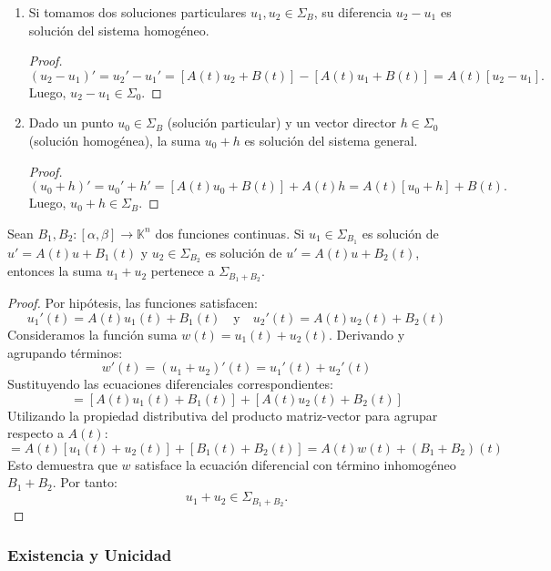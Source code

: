 \begin{enumerate}
    \item Si tomamos dos soluciones particulares $u_1, u_2 \in \Sigma_B$, su diferencia $u_2 - u_1$ es solución del sistema homogéneo.
    \begin{proof}
        \[
            (u_2 - u_1)' = u_2' - u_1' = [A(t) u_2 + B(t)] - [A(t) u_1 + B(t)] = A(t) [u_2 - u_1].
        \]
        Luego, $u_2 - u_1 \in \Sigma_0$.
    \end{proof}
    
    \item Dado un punto $u_0 \in \Sigma_B$ (solución particular) y un vector director $h \in \Sigma_0$ (solución homogénea), la suma $u_0 + h$ es solución del sistema general.
    \begin{proof}
        \[
            (u_0 + h)' = u_0' + h' = [A(t) u_0 + B(t)] + A(t) h = A(t) [u_0 + h] + B(t).
        \]
        Luego, $u_0 + h \in \Sigma_B$.
    \end{proof}
\end{enumerate}

\begin{proposición}
    Sean $B_1, B_2: [\alpha, \beta] \to \mathbb{K}^n$ dos funciones continuas. Si $u_1 \in \Sigma_{B_1}$ es solución de $u' = A(t)u + B_1(t)$ y $u_2 \in \Sigma_{B_2}$ es solución de $u' = A(t)u + B_2(t)$, entonces la suma $u_1 + u_2$ pertenece a $\Sigma_{B_1 + B_2}$.
\end{proposición}

\begin{proof}
    Por hipótesis, las funciones satisfacen:
    \[
        u_1'(t) = A(t) u_1(t) + B_1(t) \quad \text{y} \quad u_2'(t) = A(t) u_2(t) + B_2(t)
    \]
    Consideramos la función suma $w(t) = u_1(t) + u_2(t)$. Derivando y agrupando términos:
    \[
        w'(t) = (u_1 + u_2)'(t) = u_1'(t) + u_2'(t)
    \]
    Sustituyendo las ecuaciones diferenciales correspondientes:
    \[
        = [A(t) u_1(t) + B_1(t)] + [A(t) u_2(t) + B_2(t)]
    \]
    Utilizando la propiedad distributiva del producto matriz-vector para agrupar respecto a $A(t)$:
    \[
        = A(t) [u_1(t) + u_2(t)] + [B_1(t) + B_2(t)] = A(t) w(t) + (B_1 + B_2)(t)
    \]
    Esto demuestra que $w$ satisface la ecuación diferencial con término inhomogéneo $B_1 + B_2$. Por tanto:
    \[
        u_1 + u_2 \in \Sigma_{B_1 + B_2}.
    \]
\end{proof}

\subsubsection*{Existencia y Unicidad}

